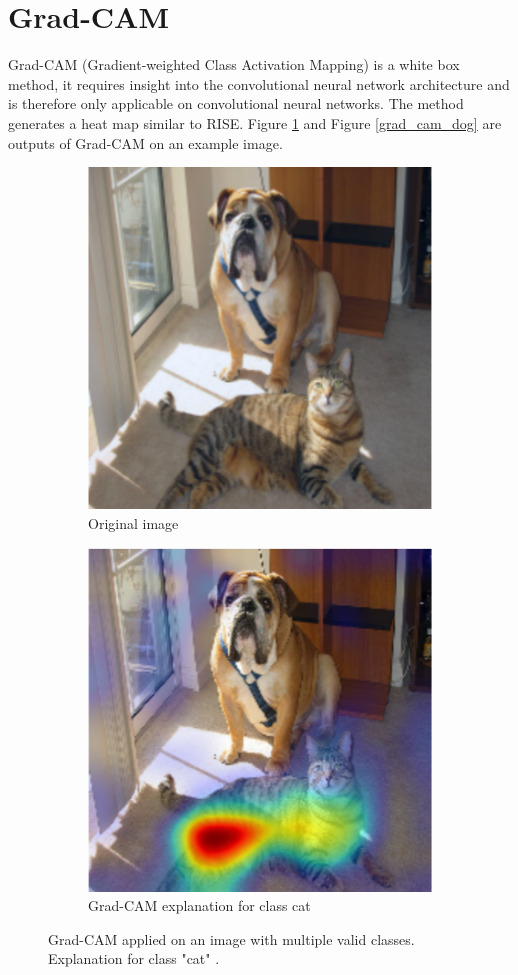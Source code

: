 \section{Grad-CAM}
Grad-CAM \cite{selvaraju2017grad} (Gradient-weighted Class Activation Mapping) is a white box method, it requires insight into the convolutional neural network architecture and is therefore only applicable on convolutional neural networks. The method generates a heat map similar to RISE. Figure \ref{grad_cam_cat} and Figure \ref{grad_cam_dog} are outputs of Grad-CAM on an example image.

\begin{figure}[H]
    \centering
    \begin{subfigure}{.5\textwidth}
        \centering
        \includegraphics[width=0.7\linewidth]{chapters/02_methods/images/grad-cam-original.png}
        \caption{Original image}
    \end{subfigure}\hfill%
    \begin{subfigure}{.5\textwidth}
        \centering
        \includegraphics[width=0.7\linewidth]{chapters/02_methods/images/grad-cam-cat.png}
        \caption{Grad-CAM explanation for class cat}
    \end{subfigure}
    \caption{Grad-CAM applied on an image with multiple valid classes. Explanation for class "cat" \cite{selvaraju2017grad}.}
    \label{grad_cam_cat}
\end{figure}

